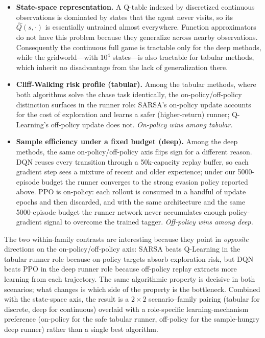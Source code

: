\documentclass[conference]{IEEEtran}
\begin{document}
\begin{itemize}
    \item \textbf{State-space representation.} A Q-table indexed by
    discretized continuous observations is dominated by states that
    the agent never visits, so its $\hat Q(s,\cdot)$ is essentially
    untrained almost everywhere. Function approximators do not have
    this problem because they generalize across nearby observations.
    Consequently the continuous full game is tractable only for the
    deep methods, while the gridworld---with $10^4$ states---is also
    tractable for tabular methods, which inherit no disadvantage from
    the lack of generalization there.
    \item \textbf{Cliff-Walking risk profile (tabular).} Among the
    tabular methods, where both algorithms solve the chase task
    identically, the on-policy/off-policy distinction surfaces in the
    runner role: SARSA's on-policy update accounts for the cost of
    exploration and learns a safer (higher-return) runner;
    Q-Learning's off-policy update does not. \emph{On-policy wins
    among tabular.}
    \item \textbf{Sample efficiency under a fixed budget (deep).}
    Among the deep methods, the same on-policy/off-policy axis flips
    sign for a different reason. DQN reuses every transition through
    a 50k-capacity replay buffer, so each gradient step sees a mixture
    of recent and older experience; under our 5000-episode budget the
    runner converges to the strong evasion policy reported above. PPO
    is on-policy: each rollout is consumed in a handful of update
    epochs and then discarded, and with the same architecture and the
    same 5000-episode budget the runner network never accumulates
    enough policy-gradient signal to overcome the trained tagger.
    \emph{Off-policy wins among deep.}
\end{itemize}

The two within-family contrasts are interesting because they point in
\emph{opposite} directions on the on-policy/off-policy axis: SARSA
beats Q-Learning in the tabular runner role because on-policy targets
absorb exploration risk, but DQN beats PPO in the deep runner role
because off-policy replay extracts more learning from each trajectory.
The same algorithmic property is decisive in both scenarios; what
changes is which side of the property is the bottleneck. Combined with
the state-space axis, the result is a $2{\times}2$ scenario--family
pairing (tabular for discrete, deep for continuous) overlaid with a
role-specific learning-mechanism preference (on-policy for the safe
tabular runner, off-policy for the sample-hungry deep runner) rather
than a single best algorithm.
\end{document}
